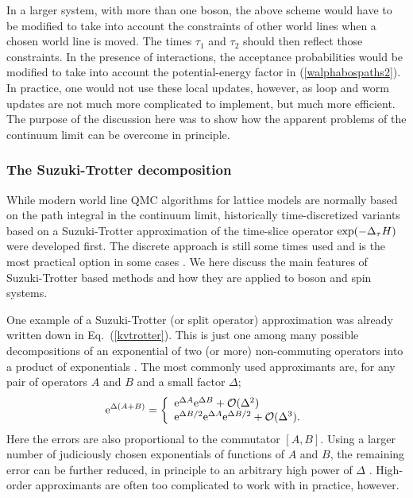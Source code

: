 \documentclass[draft,numberedheadings]{aipproc}
\begin{document}
In a larger system, with more than one boson, the above scheme would have to be modified to take into account the constraints of other world lines when a chosen 
world line is moved. The times $\tau_1$ and $\tau_2$ should then reflect those constraints. In the presence of interactions, the acceptance probabilities would 
be modified to take into account the potential-energy factor in (\ref{walphabospaths2}). In practice, one would not use these local updates, however, as loop 
and worm updates \cite{prokofev96,beard,syljuasen02} are not much more complicated to implement, but much more efficient. The purpose of the discussion here 
was to show how the apparent problems of the continuum limit can be overcome in principle.

\subsubsection{The Suzuki-Trotter decomposition}
\label{sec_suzuki}

While modern world line QMC algorithms for lattice models are normally based on the path integral in the continuum limit, historically
time-discretized variants based on a Suzuki-Trotter approximation of the time-slice operator ${\rm exp}{(-\Delta_\tau H)}$ were developed first. The discrete 
approach is still some times used and is the most practical option in some cases \cite{werner05}. We here discuss the main features of Suzuki-Trotter 
based methods and how they are applied to boson and spin systems.

One example of a Suzuki-Trotter (or split operator) approximation \cite{suzuki76,trotter59} was already written down in Eq.~(\ref{kvtrotter}). This is just one 
among many possible decompositions of an exponential of two (or more) non-commuting operators into a product of exponentials \cite{deraedt83}. The most commonly 
used approximants are, for any pair of operators $A$ and $B$ and a small factor $\Delta$;
\begin{equation}
{\rm e}^{\Delta (A+B)} = \left\lbrace
\begin{array}{l}
{\rm e}^{\Delta A}{\rm e}^{\Delta B} + {\cal O}(\Delta^2) \\
{\rm e}^{\Delta B/2}{\rm e}^{\Delta A}{\rm e}^{\Delta B/2} + {\cal O}(\Delta^3).
\end{array}\right.
\label{trotter23}
\end{equation}
Here the errors are also proportional to the commutator $[A,B]$. Using a larger number of judiciously chosen exponentials of functions of $A$ and $B$, the remaining 
error can be further reduced, in principle to an arbitrary high power of $\Delta$ \cite{hatano05}. High-order approximants are often too complicated to work 
with in practice, however. 
\end{document}
